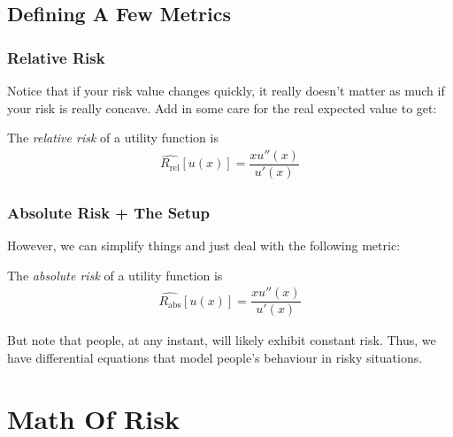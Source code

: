 \documentclass{beamer}
\begin{document}
    \subsection{Defining A Few Metrics}
        \begin{frame}
            \frametitle{Relative Risk}
                Notice that if your risk value changes quickly, it really doesn't matter as much if your risk is really concave. Add in some care for the real expected value to get:
                \begin{definition}
                    The \textit{relative risk} of a utility function is
                    \begin{align*}
                        \hat{R_{\text{rel}}}[u(x)] = \dfrac{xu''(x)}{u'(x)}
                    \end{align*}
                \end{definition}
                
        \end{frame}
        \begin{frame}
            \frametitle{Absolute Risk + The Setup}
                However, we can simplify things and just deal with the following metric: \pause
                \begin{definition}
                    The \textit{absolute risk} of a utility function is
                    \begin{align*}
                        \hat{R_{\text{abs}}}[u(x)] = \dfrac{xu''(x)}{u'(x)}
                    \end{align*}
                \end{definition}
                \pause But note that people, at any instant, will likely exhibit constant risk. Thus, we have differential equations
                that model people's behaviour in risky situations.
        \end{frame}
\section{Math Of Risk}
\end{document}
